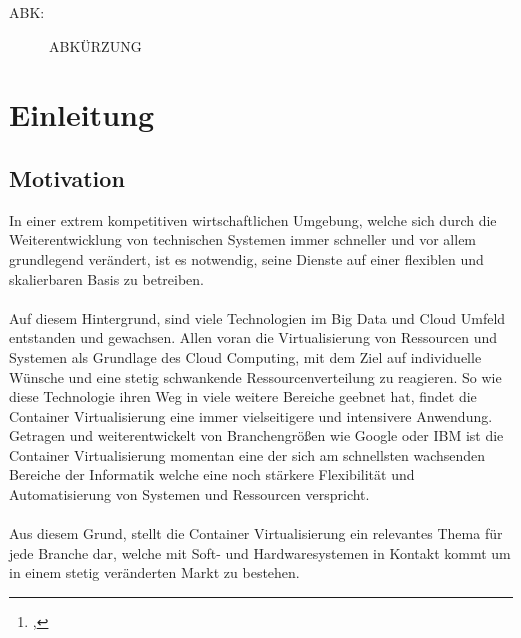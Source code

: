 \documentclass[12pt,toc=bib,toc=listof]{scrreprt}
\title{\ebttopic}
\author{\ebtstudentname\footnote{\ebtstudentid, \ebtstudentmail}}
\begin{document}
\maketitle
\tableofcontents

\label{sec:abkuerzungsverzeichnis}

\begin{description}
  \item[ABK:] ABKÜRZUNG 
\end{description}


\listoffigures
\listoftables

\onehalfspacing
\newpage
{}

\chapter{Einleitung} %
\label{sec:einleitung}

\section{Motivation} %
\label{sec:motivation}

In einer extrem kompetitiven wirtschaftlichen Umgebung, welche sich durch die Weiterentwicklung von technischen Systemen immer schneller und vor allem grundlegend verändert,
ist es notwendig, seine Dienste auf einer flexiblen und skalierbaren Basis zu betreiben.\\
\\
Auf diesem Hintergrund, sind viele Technologien im Big Data und Cloud Umfeld entstanden und gewachsen.
Allen voran die Virtualisierung von Ressourcen und Systemen als Grundlage des Cloud Computing, mit dem Ziel auf individuelle Wünsche und eine stetig schwankende Ressourcenverteilung zu reagieren.
So wie diese Technologie ihren Weg in viele weitere Bereiche geebnet hat, findet die Container Virtualisierung eine immer vielseitigere und intensivere Anwendung.
Getragen und weiterentwickelt von Branchengrößen wie Google oder IBM ist die Container Virtualisierung momentan eine der sich am schnellsten wachsenden Bereiche der Informatik welche eine noch stärkere Flexibilität und Automatisierung von Systemen und Ressourcen verspricht.\\
\\
Aus diesem Grund, stellt die Container Virtualisierung ein relevantes Thema für jede Branche dar, welche mit Soft- und Hardwaresystemen in Kontakt kommt um in einem stetig veränderten Markt zu bestehen.
\end{document}
